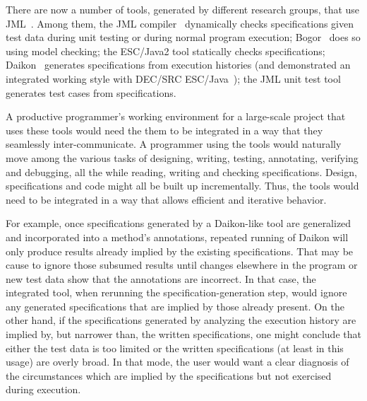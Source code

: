 \documentclass{sig-alternate}
\begin{document}
There are now a number of tools, generated by different research
groups, that use JML~\cite{Burdy-etal03}.  Among them, the
JML compiler~\cite{Cheon-Leavens02b} dynamically checks
specifications given test data during unit testing or during normal program execution; 
Bogor~\cite{Bogor03} does so using model checking;
the ESC/Java2 tool statically checks specifications;
Daikon~\cite{Ernst-etal01} generates specifications from execution histories (and demonstrated an
integrated working style
with DEC/SRC ESC/Java~\cite{NimmerErnst01});
the JML unit test tool~\cite{Cheon-Leavens02} generates test
cases from specifications.
 
A productive programmer's working environment for a large-scale
project that uses these tools would need the them to be integrated in
a way that they seamlessly inter-communicate.  A
programmer using the tools would naturally move among the various
tasks of designing, writing,
testing, annotating, verifying and debugging, all the while reading, writing
and checking specifications.  Design, specifications and code might all
be built up incrementally.  Thus, the tools would
need to be integrated in a way that allows efficient and iterative
behavior.

For example, once specifications generated by a Daikon-like tool are
generalized and incorporated into a method's annotations, repeated
running of Daikon will only produce results already implied by the
existing specifications.  That may be cause to ignore those subsumed
results until changes elsewhere in the program or new test data show
that the annotations are incorrect.  In that case, the integrated tool,
when rerunning the specification-generation step, would ignore any
generated specifications that are implied by those already present.
On the other hand, if the
specifications generated by analyzing the execution history are
implied by, but narrower than, the written specifications, one might
conclude that either the test data is too limited or the written
specifications (at least in this usage) are overly broad.  In that mode,
the user would want a clear diagnosis of the circumstances which
are implied by the specifications but not exercised during execution. 

\end{document}
